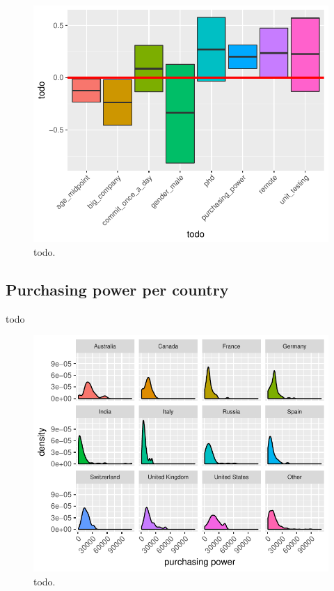 \documentclass{article}
\begin{document}
\begin{figure}[H]
\centering
\includegraphics{report-021}
\caption{todo.}\label{fig_5}
\end{figure}

\subsection{Purchasing power per country}
todo


\begin{figure}[H]
\centering
\includegraphics{report-023}
\caption{todo.}\label{fig_6}
\end{figure}
\end{document}
